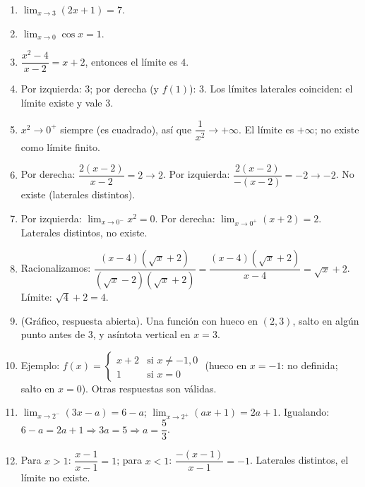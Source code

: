 \documentclass[12pt, letterpaper]{article}
\begin{document}
  \begin{enumerate}[series=respuestas, leftmargin=*, label=\textbf{\arabic*.}]
    \item $\lim_{x \to 3} (2x + 1) = 7$.

    \item $\lim_{x \to 0} \cos x = 1$.

    \item $\dfrac{x^2 - 4}{x - 2} = x + 2$, entonces el límite es $4$.

    \item Por izquierda: $3$; por derecha (y $f(1)$): $3$. Los límites laterales coinciden: el límite existe y vale 3.

    \item $x^2 \to 0^+$ siempre (es cuadrado), así que $\dfrac{1}{x^2} \to +\infty$. El límite es $+\infty$; no existe como límite finito.

    \item Por derecha: $\dfrac{2(x-2)}{x-2} = 2 \to 2$. Por izquierda: $\dfrac{2(x-2)}{-(x-2)} = -2 \to -2$. No existe (laterales distintos).

    \item Por izquierda: $\lim_{x \to 0^-} x^2 = 0$. Por derecha: $\lim_{x \to 0^+} (x + 2) = 2$. Laterales distintos, no existe.

    \item Racionalizamos: $\dfrac{(x - 4)(\sqrt{x} + 2)}{(\sqrt{x} - 2)(\sqrt{x} + 2)} = \dfrac{(x-4)(\sqrt{x}+2)}{x - 4} = \sqrt{x} + 2$. Límite: $\sqrt{4} + 2 = 4$.

    \item (Gráfico, respuesta abierta). Una función con hueco en $(2,3)$, salto en algún punto antes de 3, y asíntota vertical en $x = 3$.

    \item Ejemplo: $f(x) = \begin{cases} x + 2 & \text{si } x \neq -1, 0 \\ 1 & \text{si } x = 0 \end{cases}$ (hueco en $x = -1$: no definida; salto en $x = 0$). Otras respuestas son válidas.

    \item $\lim_{x \to 2^-} (3x - a) = 6 - a$; $\lim_{x \to 2^+} (ax + 1) = 2a + 1$. Igualando: $6 - a = 2a + 1 \Rightarrow 3a = 5 \Rightarrow a = \dfrac{5}{3}$.

    \item Para $x > 1$: $\dfrac{x-1}{x-1} = 1$; para $x < 1$: $\dfrac{-(x-1)}{x-1} = -1$. Laterales distintos, el límite no existe.
  \end{enumerate}
\end{document}
